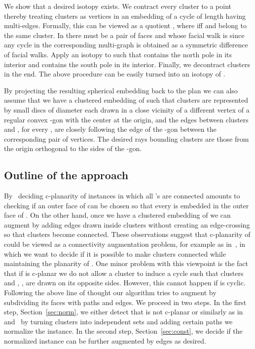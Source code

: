 \documentclass{llncs}
\begin{document}
We show that a desired isotopy exists. We contract every cluster to a point thereby
treating clusters as vertices in an embedding  of a cycle  of length  having multi-edges. 
Formally, this can be viewed as a quotient , where  iff
 and  belong to the same cluster.
In  there must be a pair of faces  and  whose facial walk is  since any cycle in the corresponding multi-graph is obtained as a symmetric difference of facial walks. Apply an isotopy to  such that  contains
the north pole in its interior and  contains the south pole in its interior. Finally, we decontract clusters in the end. The above procedure can be easily turned into an isotopy of . 

By projecting the resulting spherical embedding back to the plan we can also assume that we have a clustered embedding of 
such that clusters are represented by small discs of diameter  each drawn in a close vicinity
of a different vertex of a regular convex -gon with the center at the origin, and the edges
between clusters  and , for every , are closely following the edge
of the -gon between the corresponding pair of vertices. 
The desired rays bounding clusters are those from the origin orthogonal to the sides of the -gon. \\
\fi




\subsection{Outline of the approach}
\label{sec:out}
By~\cite[Theorem 1]{FCEb95} deciding c-planarity of instances  in which all 's are connected amounts to 
checking if an outer face of  can be chosen so that every  is embedded in the outer face 
of . On the other hand, once we have a clustered embedding of  we can augment  by adding edges drawn inside clusters without creating an edge-crossing so that clusters become connected.
These observations suggest that c-planarity of  could be viewed as a connectivity augmentation problem, for example as in~\cite{CBFK14+,FKMP15},
in which we want to decide if it is possible to make clusters connected  while maintaining the planarity of .
One minor problem with this viewpoint is the fact that if  is c-planar we do not allow
a cluster  to induce a cycle such that clusters  and , , are drawn on its opposite 
sides. However, this cannot happen  if  is cyclic.
Following the above line of thought our algorithm tries to augment  by subdividing its faces with
paths and edges. We proceed in two steps. In the first step, Section~\ref{sec:norm}, we either 
detect that  is not c-planar or similarly as in~\cite{ADDF13} and~\cite{F14+} by 
turning clusters into independent sets and adding certain paths we normalize the instance. In the second step, Section~\ref{sec:const}, we decide if the normalized instance can be further augmented by  edges as desired.
\end{document}

